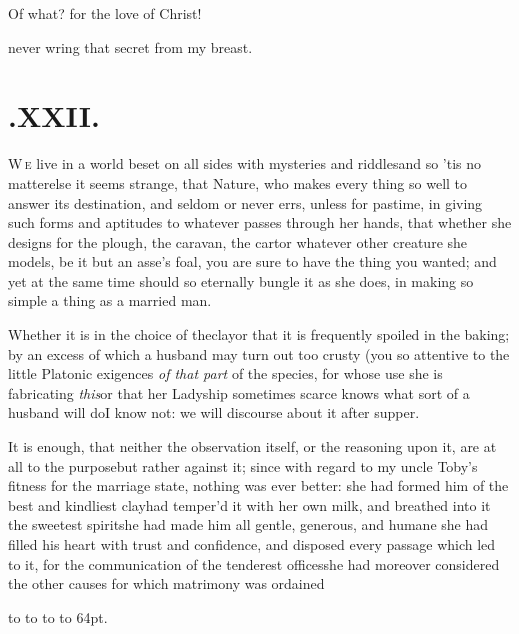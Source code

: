 \documentclass{article}
\begin{document}
\tsh Of what? for the love of Christ!

\noindent
{}
never wring that secret from my breast.

\newpage
\section{.\enspace XXII.}

\lettrine{W}{\,e} live in a world beset on all sides
with mysteries and riddles\tsk\break and so ’tis no
matter\tsh else it seems strange, that Nature, who makes
every thing so well to answer its destination, and seldom or never
errs, unless for pastime, in giving such forms and aptitudes to
whatever passes through her hands, that whether she designs for the
plough, the caravan, the cart\tsk or whatever other creature she
models, be it but an asse’s foal, you are sure to have the thing you wanted; and
yet at the same time should so eternally bungle it as she does, in\break
making so simple a thing as a married man.

\newpage
Whether it is in the choice of the\break clay\tsh or that it
is frequently spoiled in the baking; by an excess of which a
husband may turn out too crusty (you\break
{}
so
attentive to the little Platonic exigen\-ces \textit{of that part} of
the species, for whose use she is fabricating
\textit{this}\tsh or that her Ladyship sometimes scarce
knows what sort of a husband will do\tsh I know not: we
will discourse about it after supper.

It is enough, that neither the observation itself, or the reasoning upon it, are at
all to the purpose\tsk but rather against it; since with regard to my uncle\pb
Toby’s fitness for the marriage state, nothing was ever better: she had formed him
of the best and kindliest clay\tsh\break had temper’d it with her own milk, and breathed
into it the sweetest spirit\tsh she had made him all gentle, generous, and humane
\tsh she had filled his heart with trust and confidence, and disposed every passage
which led to it, for the communication of the tenderest offices\tsh she had
moreover considered the other causes for which matrimony was ordained\tsh

\noindent
\hbox to 
\hbox to \hsize{\starfill}
\hbox to \hsize{\starfill}
\hbox to 64pt{\starfill .}
\end{document}
